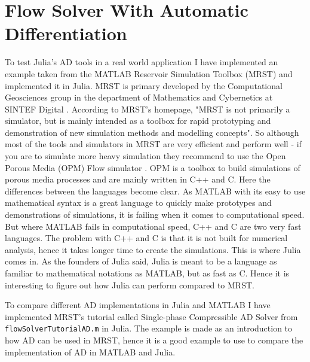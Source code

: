 \section{Flow Solver With Automatic Differentiation}
\label{sec:FlowSolver}
To test Julia's AD tools in a real world application I have implemented an example taken from the MATLAB Reservoir Simulation Toolbox (MRST) and implemented it in Julia. MRST is primary developed by the Computational Geosciences group in the department of Mathematics and Cybernetics at SINTEF Digital \emph{\cite{mrstHomepage}}. According to MRST's homepage, "MRST is not primarily a simulator, but is mainly intended as a toolbox for rapid prototyping and demonstration of new simulation methods and modelling concepts". So although most of the tools and simulators in MRST are very efficient and perform well - if you are to simulate more heavy simulation they recommend to use the Open Porous Media (OPM) Flow simulator \emph{\citep{OPM}}. OPM is a toolbox to build simulations of porous media processes and are mainly written in C++ and C. Here the differences between the languages become clear. As MATLAB with its easy to use mathematical syntax is a great language to quickly make prototypes and demonstrations of simulations, it is failing when it comes to computational speed. But where MATLAB fails in computational speed, C++ and C are two very fast languages. The problem with C++ and C is that it is not built for numerical analysis, hence it takes longer time to create the simulations. This is where Julia comes in. As the founders of Julia said, Julia is meant to be a language as familiar to mathematical notations as MATLAB, but as fast as C. Hence it is interesting to figure out how Julia can perform compared to MRST.

To compare different AD implementations in Julia and MATLAB I have implemented MRST's tutorial called Single-phase Compressible AD Solver from \texttt{flowSolverTutorialAD.m} \emph{\citep{flowSolverADExample}} in Julia. The example is made as an introduction to how AD can be used in MRST, hence it is a good example to use to compare the implementation of AD in MATLAB and Julia. 

